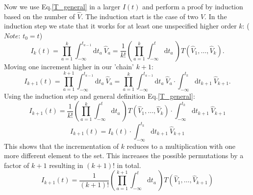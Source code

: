 \documentclass[
11pt, %
english, %
singlespacing, %
headsepline, %
]{MastersDoctoralThesis} %
\begin{document}
\begin{subappendices}
Now we use Eq.\enskip\eqref{T_general} in a larger $ I(t) $ and perform a proof by induction based on the number of $ \hat{V} $. The induction start is the case of two $ \hat{V} $. In the induction step we state that it works for at least one unspecified higher order $ k $: ($ \textit{Note:} $ $ t_0 = t $)\\
\begin{equation}
I_k (t)
=
 \prod_{a=1}^{k} 
 \int_{-\infty}^{t_{a-1}}\mathrm{d}t_a\
  \hat{V}_a
=
\dfrac{1}{k!}
 (
 \prod_{a=1}^{k} 
\int_{-\infty}^{t}\mathrm{d}t_a\
)
T(\hat{V}_1,\ldots,\hat{V}_k).
\end{equation}
Moving one increment higher in our 'chain' $ k+1 $:
\begin{equation}
I_{k+1} (t)
=
 \prod_{a=1}^{k+1} 
 \int_{-\infty}^{t_{a-1}}\mathrm{d}t_a\
  \hat{V}_a
  =
   \prod_{a=1}^{k} 
 \int_{-\infty}^{t_{a-1}}\mathrm{d}t_a\
  \hat{V}_a
  \cdot
 \int_{-\infty}^{t_{k}}\mathrm{d}t_{k+1}\
 \hat{V}_{k+1}.
\end{equation}
Using the induction step and general definition Eq.\enskip\eqref{T_general}:
\begin{equation}
I_{k+1} (t)
=
\dfrac{1}{k!}
 (
 \prod_{a=1}^{k} 
\int_{-\infty}^{t}\mathrm{d}t_a\
)
T(\hat{V}_1,\ldots,\hat{V}_k)
\cdot
 \int_{-\infty}^{t_{k}}\mathrm{d}t_{k+1}\
 \hat{V}_{k+1}
\end{equation}
\begin{equation}
I_{k+1} (t)
=
I_k (t)
\cdot
 \int_{-\infty}^{t_{k}}\mathrm{d}t_{k+1}\
 \hat{V}_{k+1}
\end{equation}
This shows that the incrementation of $ k $ reduces to a multiplication with one more different element to the set. This increases the possible permutations by a factor of $ k+1 $ resulting in $ (k+1)! $ in total.
\begin{equation}
I_{k+1}(t)
=
\dfrac{1}{(k+1)!}
 (
 \prod_{a=1}^{k+1} 
\int_{-\infty}^{t}\mathrm{d}t_a\
)
T(\hat{V}_1,\ldots,\hat{V}_{k+1})
\end{equation}


\end{subappendices}
\end{document}
